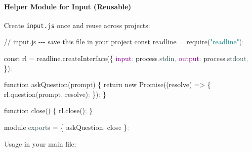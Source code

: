\documentclass[
  justified,
  openright,
]{tufte-book}
\let\subsubsection\paragraph
\let\paragraph\paragraph
\newcommand{\AttributeTok}[1]{\textcolor{DarkSlateGray}{#1}}
\newcommand{\BuiltInTok}[1]{#1}
\newcommand{\CommentTok}[1]{\textcolor{MidGray}{#1}}
\newcommand{\ControlFlowTok}[1]{\textcolor{BrandBlue}{#1}}
\newcommand{\DataTypeTok}[1]{\textcolor{Purple}{#1}}
\newcommand{\FunctionTok}[1]{\textcolor{BrandBlue}{#1}}
\newcommand{\KeywordTok}[1]{\textcolor{BrandBlue}{#1}}
\newcommand{\NormalTok}[1]{#1}
\newcommand{\OperatorTok}[1]{\textcolor{DarkGray}{#1}}
\newcommand{\PreprocessorTok}[1]{\textcolor{BrandAccent}{#1}}
\newcommand{\StringTok}[1]{\textcolor{Teal}{#1}}
\newenvironment{Shaded}{%
  \begin{snugshade}
}{%
  \end{snugshade}
}
\let\subsubsection\paragraph
\let\paragraph\paragraph
\begin{document}
\subsubsection{Helper Module for Input
(Reusable)}\label{helper-module-for-input-reusable}

Create \texttt{input.js} once and reuse across projects:

\begin{Shaded}
\begin{Highlighting}[]
\CommentTok{// input.js {-}{-}{-} save this file in your project}
\KeywordTok{const}\NormalTok{ readline }\OperatorTok{=} \PreprocessorTok{require}\NormalTok{(}\StringTok{"readline"}\NormalTok{)}\OperatorTok{;}

\KeywordTok{const}\NormalTok{ rl }\OperatorTok{=}\NormalTok{ readline}\OperatorTok{.}\FunctionTok{createInterface}\NormalTok{(\{}
  \DataTypeTok{input}\OperatorTok{:} \BuiltInTok{process}\OperatorTok{.}\AttributeTok{stdin}\OperatorTok{,}
  \DataTypeTok{output}\OperatorTok{:} \BuiltInTok{process}\OperatorTok{.}\AttributeTok{stdout}\OperatorTok{,}
\NormalTok{\})}\OperatorTok{;}

\KeywordTok{function} \FunctionTok{askQuestion}\NormalTok{(prompt) \{}
  \ControlFlowTok{return} \KeywordTok{new} \BuiltInTok{Promise}\NormalTok{((resolve) }\KeywordTok{=\textgreater{}}\NormalTok{ \{}
\NormalTok{    rl}\OperatorTok{.}\FunctionTok{question}\NormalTok{(prompt}\OperatorTok{,}\NormalTok{ resolve)}\OperatorTok{;}
\NormalTok{  \})}\OperatorTok{;}
\NormalTok{\}}

\KeywordTok{function} \FunctionTok{close}\NormalTok{() \{}
\NormalTok{  rl}\OperatorTok{.}\FunctionTok{close}\NormalTok{()}\OperatorTok{;}
\NormalTok{\}}

\NormalTok{module}\OperatorTok{.}\AttributeTok{exports} \OperatorTok{=}\NormalTok{ \{ askQuestion}\OperatorTok{,}\NormalTok{ close \}}\OperatorTok{;}
\end{Highlighting}
\end{Shaded}

Usage in your main file:
\end{document}
